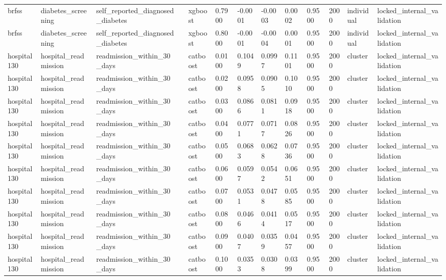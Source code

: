 \begin{tabular}{lllllllllllll}
brfss & diabetes\_screening & self\_reported\_diagnosed\_diabetes &  & xgboost & 0.7900 & -0.0001 & -0.0003 & 0.0002 & 0.9500 & 2000 & individual & locked\_internal\_validation \\
brfss & diabetes\_screening & self\_reported\_diagnosed\_diabetes &  & xgboost & 0.8000 & -0.0001 & -0.0004 & 0.0001 & 0.9500 & 2000 & individual & locked\_internal\_validation \\
hospital130 & hospital\_readmission & readmission\_within\_30\_days &  & catboost & 0.0100 & 0.1049 & 0.0997 & 0.1101 & 0.9500 & 2000 & cluster & locked\_internal\_validation \\
hospital130 & hospital\_readmission & readmission\_within\_30\_days &  & catboost & 0.0200 & 0.0958 & 0.0905 & 0.1010 & 0.9500 & 2000 & cluster & locked\_internal\_validation \\
hospital130 & hospital\_readmission & readmission\_within\_30\_days &  & catboost & 0.0300 & 0.0866 & 0.0811 & 0.0918 & 0.9500 & 2000 & cluster & locked\_internal\_validation \\
hospital130 & hospital\_readmission & readmission\_within\_30\_days &  & catboost & 0.0400 & 0.0771 & 0.0717 & 0.0826 & 0.9500 & 2000 & cluster & locked\_internal\_validation \\
hospital130 & hospital\_readmission & readmission\_within\_30\_days &  & catboost & 0.0500 & 0.0683 & 0.0628 & 0.0736 & 0.9500 & 2000 & cluster & locked\_internal\_validation \\
hospital130 & hospital\_readmission & readmission\_within\_30\_days &  & catboost & 0.0600 & 0.0597 & 0.0542 & 0.0651 & 0.9500 & 2000 & cluster & locked\_internal\_validation \\
hospital130 & hospital\_readmission & readmission\_within\_30\_days &  & catboost & 0.0700 & 0.0531 & 0.0478 & 0.0585 & 0.9500 & 2000 & cluster & locked\_internal\_validation \\
hospital130 & hospital\_readmission & readmission\_within\_30\_days &  & catboost & 0.0800 & 0.0466 & 0.0414 & 0.0517 & 0.9500 & 2000 & cluster & locked\_internal\_validation \\
hospital130 & hospital\_readmission & readmission\_within\_30\_days &  & catboost & 0.0900 & 0.0407 & 0.0359 & 0.0457 & 0.9500 & 2000 & cluster & locked\_internal\_validation \\
hospital130 & hospital\_readmission & readmission\_within\_30\_days &  & catboost & 0.1000 & 0.0353 & 0.0308 & 0.0399 & 0.9500 & 2000 & cluster & locked\_internal\_validation \\

\end{tabular}
